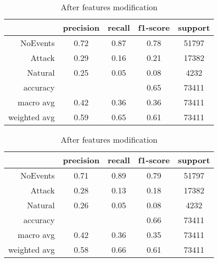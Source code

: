 \begin{table}[H]
    \centering
    \footnotesize
    \caption{Features modification results for Random Forest classifier} \label{tab:fm_rf}
    \begin{subtable}[t]{.5\linewidth}
        \centering
        \caption{Before features modification} 
        \begin{tabular}{rcccc}\toprule
            & precision    &recall & f1-score  & support \\\midrule
            NoEvents   &    0.72  &    0.87 &     0.78 &  51797 \\
            Attack     &  0.29    &  0.16   &   0.21   &  17382 \\
           Natural     &  0.25    &  0.05   &   0.08   &   4232 \\
          accuracy     &          &         &   0.65   &  73411 \\
         macro avg     &  0.42    &  0.36   &   0.36   &  73411 \\
      weighted avg     &  0.59    &  0.65   &   0.61   &  73411 \\ \bottomrule
        \end{tabular}
    \end{subtable}%
    \begin{subtable}[t]{.5\linewidth}
        \centering
        \caption{After features modification}
        \begin{tabular}{rcccc}\toprule
            &precision   & recall & f1-score &  support  \\\midrule
            NoEvents  &     0.71 &     0.89 &     0.79 &  51797\\
            Attack    &   0.28   &   0.13   &   0.18   &  17382\\
           Natural    &   0.26   &   0.05   &   0.08   &   4232\\
          accuracy    &          &          &   0.66   &  73411\\
         macro avg    &   0.42   &   0.36   &   0.35   &  73411\\
      weighted avg    &   0.58   &   0.66   &   0.61   &  73411\\     \bottomrule   
        \end{tabular}
    \end{subtable}
\end{table}

